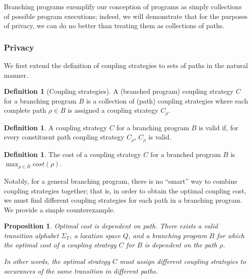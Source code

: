 \documentclass[12pt]{article}
\newtheorem{prop}[thm]{Proposition}
\theoremstyle{definition}
\newtheorem{defn}[thm]{Definition}
\begin{document}
Branching programs exemplify our conception of programs as simply collections of possible program executions; indeed, we will demonstrate that for the purposes of privacy, we can do no better than treating them as collections of paths.

\subsubsection{Privacy}

We first extend the definition of coupling strategies to sets of paths in the natural manner.

\begin{defn}[Coupling strategies]
    A (branched program) coupling strategy $C$ for a branching program $B$ is a collection of (path) coupling strategies where each complete path $\rho\in B$ is assigned a coupling strategy $C_\rho$. 
\end{defn}

\begin{defn}
    A coupling strategy $C$ for a branching program $B$ is valid if, for every constituent path coupling strategy $C_\rho$, $C_\rho$ is valid. 
\end{defn}

\begin{defn}
    The cost of a coupling strategy $C$ for a branched program $B$ is $\max_{\rho\in B}cost(\rho)$.
\end{defn}

Notably, for a general branching program, there is no ``smart'' way to combine coupling strategies together; that is, in order to obtain the optimal coupling cost, we must find different coupling strategies for each path in a branching program. We provide a simple counterexample.

\begin{prop}\label{costDependspathProp}
    Optimal cost is dependent on path. There exists a valid transition alphabet $\Sigma_T$, a location space $Q$, and a branching program $B$ for which the optimal cost of a coupling strategy $C$ for $B$ is dependent on the path $\rho$. 
    
    In other words, the optimal strategy $C$ must assign different coupling strategies to occurances of the same transition in different paths. 
\end{prop}
\end{document}
